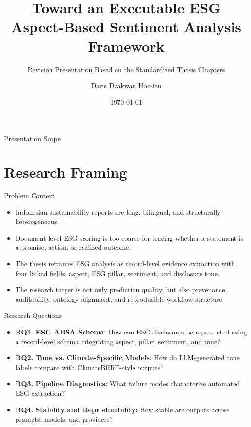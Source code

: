 \documentclass[aspectratio=169]{beamer}
\title{Toward an Executable ESG Aspect-Based Sentiment Analysis Framework}
\subtitle{Revision Presentation Based on the Standardized Thesis Chapters}
\author{Daris Dzakwan Hoesien}
\institute{University of Oulu}
\date{\today}
\begin{document}
\begin{frame}
  \titlepage
\end{frame}

\begin{frame}{Presentation Scope}
  \tableofcontents
\end{frame}

\section{Research Framing}

\begin{frame}{Problem Context}
  \begin{itemize}
    \item Indonesian sustainability reports are long, bilingual, and structurally heterogeneous.
    \item Document-level ESG scoring is too coarse for tracing whether a statement is a promise, action, or realized outcome.
    \item The thesis reframes ESG analysis as record-level evidence extraction with four linked fields: aspect, ESG pillar, sentiment, and disclosure tone.
    \item The research target is not only prediction quality, but also provenance, auditability, ontology alignment, and reproducible workflow structure.
  \end{itemize}
\end{frame}

\begin{frame}{Research Questions}
  \begin{itemize}
    \item \textbf{RQ1. ESG ABSA Schema:} How can ESG disclosures be represented using a record-level schema integrating aspect, pillar, sentiment, and tone?
    \item \textbf{RQ2. Tone vs. Climate-Specific Models:} How do LLM-generated tone labels compare with ClimateBERT-style outputs?
    \item \textbf{RQ3. Pipeline Diagnostics:} What failure modes characterize automated ESG extraction?
    \item \textbf{RQ4. Stability and Reproducibility:} How stable are outputs across prompts, models, and providers?
  \end{itemize}
\end{frame}
\end{document}
